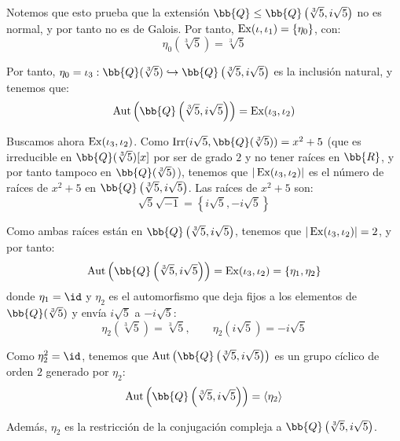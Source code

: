 \begin{ejercicio}
    Notemos que esto prueba que la extensión $\bb{Q}\leq \bb{Q}\left(\sqrt[3]{5},i\sqrt{5}\right)$ no es normal, y por tanto no es de Galois. Por tanto, $\operatorname{Ex}(\iota, \iota_1) = \{\eta_0\}$, con:
    \begin{equation*}
        \eta_0(\sqrt[3]{5}) = \sqrt[3]{5}
    \end{equation*}

    Por tanto, $\eta_0=\iota_3:\bb{Q}(\sqrt[3]{5})\hookrightarrow \bb{Q}\left(\sqrt[3]{5},i\sqrt{5}\right)$ es la inclusión natural, y tenemos que:
    \begin{equation*}
        \Aut\left(\bb{Q}\left(\sqrt[3]{5},i\sqrt{5}\right)\right) = \Ex(\iota_3, \iota_2)
    \end{equation*}

    Buscamos ahora $\operatorname{Ex}(\iota_3, \iota_2)$. Como $\Irr(i\sqrt{5},\bb{Q}(\sqrt[3]{5})) = x^2+5$ (que es irreducible en $\bb{Q}(\sqrt[3]{5})[x]$ por ser de grado $2$ y no tener raíces en $\bb{R}$, y por tanto tampoco en $\bb{Q}(\sqrt[3]{5})$), tenemos que $|\operatorname{Ex}(\iota_3, \iota_2)|$ es el número de raíces de $x^2+5$ en $\bb{Q}\left(\sqrt[3]{5},i\sqrt{5}\right)$. Las raíces de $x^2+5$ son:
    \begin{equation*}
        \sqrt{5}\sqrt{-1} = \left\{i\sqrt{5}, -i\sqrt{5}\right\}
    \end{equation*}

    Como ambas raíces están en $\bb{Q}\left(\sqrt[3]{5},i\sqrt{5}\right)$, tenemos que $|\operatorname{Ex}(\iota_3, \iota_2)| = 2$, y por tanto:
    \begin{equation*}
        \Aut\left(\bb{Q}\left(\sqrt[3]{5},i\sqrt{5}\right)\right) = \Ex(\iota_3, \iota_2) = \{\eta_1, \eta_2\}
    \end{equation*}
    donde $\eta_1=\id$ y $\eta_2$ es el automorfismo que deja fijos a los elementos de $\bb{Q}(\sqrt[3]{5})$ y envía $i\sqrt{5}$ a $-i\sqrt{5}$:
    \begin{equation*}
        \eta_2(\sqrt[3]{5}) = \sqrt[3]{5}, \qquad \eta_2(i\sqrt{5}) = -i\sqrt{5}
    \end{equation*}

    Como $\eta_2^2 = \id$, tenemos que $\Aut\left(\bb{Q}\left(\sqrt[3]{5},i\sqrt{5}\right)\right)$ es un grupo cíclico de orden $2$ generado por $\eta_2$:
    \begin{equation*}
        \Aut\left(\bb{Q}\left(\sqrt[3]{5},i\sqrt{5}\right)\right) = \langle \eta_2 \rangle
    \end{equation*}

    Además, $\eta_2$ es la restricción de la conjugación compleja a $\bb{Q}\left(\sqrt[3]{5},i\sqrt{5}\right)$.
\end{ejercicio}

